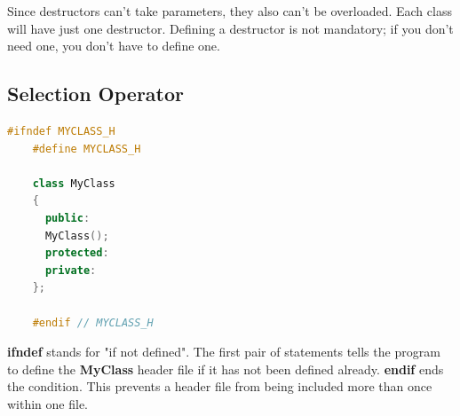 \documentclass[12pt , a4paper]{article}
\begin{document}
Since destructors can't take parameters, they also can't be overloaded. Each class will have just one destructor. Defining a destructor is not mandatory; if you don't need one, you don't have to define one.


	\subsection{Selection Operator}

	\begin{lstlisting}[language=C++]
	#ifndef MYCLASS_H
	#define MYCLASS_H
	
	class MyClass
	{
	  public:
	  MyClass();
	  protected:
	  private:
	};
	
	#endif // MYCLASS_H 

	\end{lstlisting}
\textbf{ifndef} stands for "if not defined". The first pair of statements tells the program to define the \textbf{MyClass} header file if it has not been defined already.
\textbf{endif} ends the condition. This prevents a header file from being included more than once within one file.
\end{document}

